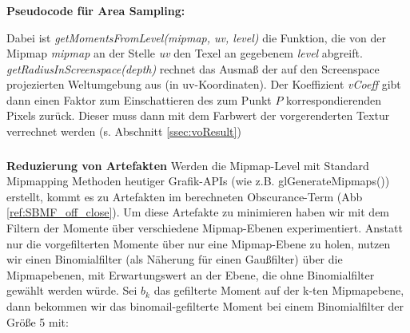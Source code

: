\documentclass[runningheaders,a4paper]{llncs}
\begin{document}
\subsubsection{} \textbf{Pseudocode für Area Sampling:} \\
\begin{algorithm}[H]
\end{algorithm}
Dabei ist \textit{getMomentsFromLevel(mipmap, uv, level)} die Funktion, die von der Mipmap \textit{mipmap}
an der Stelle \textit{uv} den Texel an gegebenem \textit{level} abgreift.
\textit{getRadiusInScreenspace(depth)} rechnet das Ausmaß der auf den Screenspace projezierten Weltumgebung
aus (in uv-Koordinaten).
Der Koeffizient \textit{vCoeff} gibt dann einen Faktor zum Einschattieren des zum Punkt $P$ korrespondierenden 
Pixels zurück. Dieser muss dann mit dem Farbwert der vorgerenderten Textur verrechnet werden (s. Abschnitt
\ref{ssec:voResult})

\subsubsection{} \textbf{Reduzierung von Artefakten} \label{sssec:SBMF}
Werden die Mipmap-Level mit Standard Mipmapping Methoden heutiger Grafik-APIs (wie z.B. glGenerateMipmaps()) erstellt, kommt es zu Artefakten im berechneten Obscurance-Term (Abb \ref{ref:SBMF_off_close}).
Um diese Artefakte zu minimieren haben wir mit dem Filtern der Momente über verschiedene Mipmap-Ebenen
experimentiert. Anstatt nur die vorgefilterten Momente über nur eine Mipmap-Ebene zu holen,
nutzen wir einen Binomialfilter (als Näherung für einen Gaußfilter) über die Mipmapebenen, mit Erwartungswert
an der Ebene, die ohne Binomialfilter gewählt werden würde. 
Sei $b_k$ das gefilterte Moment auf der k-ten Mipmapebene,
dann bekommen wir das binomail-gefilterte Moment bei einem Binomialfilter der Größe 5 mit: 
\end{document}
